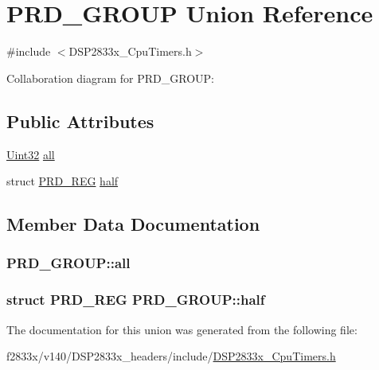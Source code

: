 \hypertarget{union_p_r_d___g_r_o_u_p}{}\section{P\+R\+D\+\_\+\+G\+R\+O\+U\+P Union Reference}
\label{union_p_r_d___g_r_o_u_p}


{\ttfamily \#include $<$D\+S\+P2833x\+\_\+\+Cpu\+Timers.\+h$>$}



Collaboration diagram for P\+R\+D\+\_\+\+G\+R\+O\+U\+P\+:
\subsection*{Public Attributes}
\begin{DoxyCompactItemize}
\item 
\hyperlink{_d_s_p2833x___device_8h_aba99025e657f892beb7ff31cecf64653}{Uint32} \hyperlink{union_p_r_d___g_r_o_u_p_aac2ae6f35e5e633da2d03079f745f1f6}{all}
\item 
struct \hyperlink{struct_p_r_d___r_e_g}{P\+R\+D\+\_\+\+R\+E\+G} \hyperlink{union_p_r_d___g_r_o_u_p_a38dfcb5749a3899913db2e1a9ed839f6}{half}
\end{DoxyCompactItemize}


\subsection{Member Data Documentation}
\hypertarget{union_p_r_d___g_r_o_u_p_aac2ae6f35e5e633da2d03079f745f1f6}{}
\subsubsection[{all}]{ P\+R\+D\+\_\+\+G\+R\+O\+U\+P\+::all}\label{union_p_r_d___g_r_o_u_p_aac2ae6f35e5e633da2d03079f745f1f6}
\hypertarget{union_p_r_d___g_r_o_u_p_a38dfcb5749a3899913db2e1a9ed839f6}{}
\subsubsection[{half}]{\setlength{\rightskip}{0pt plus 5cm}struct {\bf P\+R\+D\+\_\+\+R\+E\+G} P\+R\+D\+\_\+\+G\+R\+O\+U\+P\+::half}\label{union_p_r_d___g_r_o_u_p_a38dfcb5749a3899913db2e1a9ed839f6}


The documentation for this union was generated from the following file\+:\begin{DoxyCompactItemize}
\item 
f2833x/v140/\+D\+S\+P2833x\+\_\+headers/include/\hyperlink{_d_s_p2833x___cpu_timers_8h}{D\+S\+P2833x\+\_\+\+Cpu\+Timers.\+h}\end{DoxyCompactItemize}
